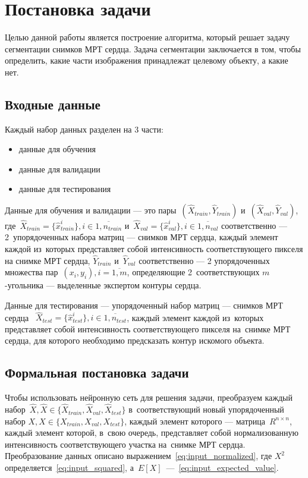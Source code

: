 \section{Постановка задачи}

Целью данной работы является построение алгоритма, который решает задачу сегментации снимков МРТ сердца. Задача сегментации заключается в том, чтобы определить, какие части изображения принадлежат целевому объекту, а какие нет. 

\subsection{Входные данные}

Каждый набор данных разделен на 3 части: 

\begin{itemize}
  \item данные для обучения
  \item данные для валидации
  \item данные для тестирования
\end{itemize}

Данные для обучения и валидации — это пары~$(\hat{X}_{train},\hat{Y}_{train})$ 
и~$(\hat{X}_{val},\hat{Y}_{val})$, 
где~$\hat{X}_{train} = \{\hat{x}_{train}^{i}\}, i\in{}\overline{1,n_{train}}$ 
и~$\hat{X}_{val} = \{\hat{x}_{val}^{i}\}, i\in{}\overline{1,n_{val}}$ соответственно 
— 2~упорядоченных набора матриц — снимков МРТ сердца, каждый элемент каждой из~которых 
представляет собой интенсивность соответствующего пикселя на снимке МРТ сердца, 
$\hat{Y}_{train}$ и~$\hat{Y}_{val}$ соответственно 
— 2 упорядоченных множества пар~$(x_{i},y_{i}), i = \overline{1,m}$, 
определяющие 2~соответствующих \mbox{$m$-угольника} 
— выделенные экспертом контуры сердца.

Данные для тестирования — упорядоченный набор 
матриц — снимков МРТ сердца ~$\hat{X}_{test} = \{\hat{x}_{test}^{i}\}, i\in{}\overline{1,n_{test}}$, 
каждый элемент каждой из~которых представляет собой интенсивность соответствующего 
пикселя на~снимке МРТ сердца, для которого необходимо предсказать контур искомого объекта.

\subsection{Формальная постановка задачи}

Чтобы использовать нейронную сеть для решения задачи, преобразуем каждый 
набор~$\hat{X},\hat{X}\in{}\{\hat{X}_{train},\hat{X}_{val},\hat{X}_{test}\}$ 
в~соответствующий новый упорядоченный набор $X,X\in{}\{X_{train},X_{val},X_{test}\}$, 
каждый элемент которого — матрица~$R^{n\times{}n}$, каждый элемент которой, 
в~свою очередь, представляет собой нормализованную интенсивность соответствующего 
участка на~снимке МРТ сердца. Преобразование данных описано выражением~\eqref{eq:input_normalized},
где $X^{2}$ определяется~\eqref{eq:input_squared}, а~$E[X]$~—~\eqref{eq:input_expected_value}.

